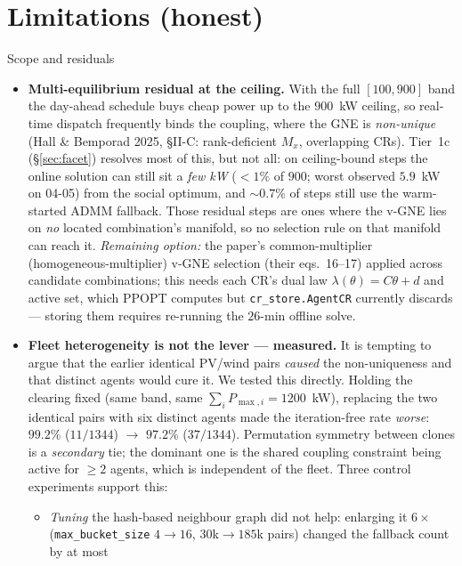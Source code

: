 \documentclass[11pt, letterpaper]{article}
\begin{document}
\section{Limitations (honest)}\label{sec:limit}
\begin{warnbox}{Scope and residuals}
\begin{itemize}[nosep]
\item \textbf{Multi-equilibrium residual at the ceiling.} With the full $[100,900]$ band the
day-ahead schedule buys cheap power up to the $900$~kW ceiling, so real-time dispatch frequently
binds the coupling, where the GNE is \emph{non-unique} (Hall \& Bemporad 2025, \S II-C: rank-deficient
$M_x$, overlapping CRs). Tier~1c (\S\ref{sec:facet}) resolves most of this, but not all: on
ceiling-bound steps the online solution can still sit a \emph{few kW} ($<\!1\%$ of $900$; worst
observed $5.9$~kW on 04-05) from the social optimum, and $\sim\!0.7\%$ of steps still use
the warm-started ADMM fallback. Those residual steps are ones where the v-GNE lies on \emph{no}
located combination's manifold, so no selection rule on that manifold can reach it. \emph{Remaining
option:} the paper's common-multiplier (homogeneous-multiplier) v-GNE selection (their eqs.~16--17)
applied across candidate combinations; this needs each CR's dual law $\lambda(\theta)=C\theta+d$ and
active set, which PPOPT computes but \texttt{cr\_store.AgentCR} currently discards --- storing them
requires re-running the $26$-min offline solve.
\item \textbf{Fleet heterogeneity is not the lever --- measured.} It is tempting to argue that the
earlier identical PV/wind pairs \emph{caused} the non-uniqueness and that distinct agents would cure
it. We tested this directly. Holding the clearing fixed (same band, same
$\sum_iP_{\max,i}=1200$~kW), replacing the two identical pairs with six distinct agents made the
iteration-free rate \emph{worse}: $99.2\%$ ($11/1344$) $\to$ $97.2\%$ ($37/1344$). Permutation
symmetry between clones is a \emph{secondary} tie; the dominant one is the shared coupling
constraint being active for $\ge2$ agents, which is independent of the fleet. Three control
experiments support this:
\begin{itemize}[nosep]
\item \emph{Tuning} the hash-based neighbour graph did not help: enlarging it $6\times$
(\texttt{max\_bucket\_size} $4\to16$, $30$k$\to$$185$k pairs) changed the fallback count by at most
$$
\end{itemize}
\end{itemize}
\end{warnbox}
\end{document}
